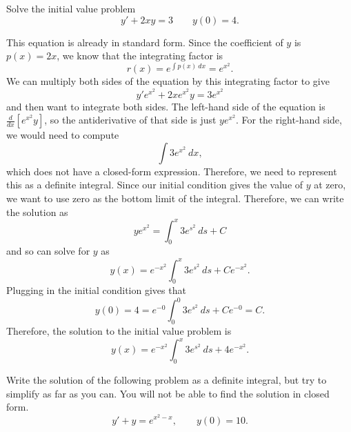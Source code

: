 \begin{example}
Solve the initial value problem
\begin{equation*}
y' + 2xy = 3 \qquad y(0) = 4.
\end{equation*}
\end{example}
\begin{exampleSol}
This equation is already in standard form. Since the coefficient of $y$ is $p(x) = 2x$, we know that the integrating factor is 
\begin{equation*}
r(x) = e^{\int p(x)\ dx} = e^{x^2}.
\end{equation*}
We can multiply both sides of the equation by this integrating factor to give
\begin{equation*}
y'e^{x^2} + 2xe^{x^2}y = 3e^{x^2}
\end{equation*} and then want to integrate both sides. The left-hand side of the equation is $\frac{d}{dx}[e^{x^2}y]$, so the antiderivative of that side is just $ye^{x^2}$. For the right-hand side, we would need to compute
\[ \int 3e^{x^2}\ dx, \] which does not have a closed-form expression. Therefore, we need to represent this as a definite integral. Since our initial condition gives the value of $y$ at zero, we want to use zero as the bottom limit of the integral. Therefore, we can write the solution as
\[ ye^{x^2} = \int_0^x 3e^{s^2}\ ds + C \] and so can solve for $y$ as
\begin{equation*}
y(x) = e^{-x^2} \int_0^x 3e^{s^2}\ ds + Ce^{-x^2}.
\end{equation*}
Plugging in the initial condition gives that
\begin{equation*}
y(0) = 4 = e^{-0} \int_0^0 3e^{s^2}\ ds + Ce^{-0} = C.
\end{equation*}
Therefore, the solution to the initial value problem is
\begin{equation*}
y(x) = e^{-x^2} \int_0^x 3e^{s^2}\ ds + 4e^{-x^2}.
\end{equation*}
\end{exampleSol}


\begin{exercise}
Write the solution of the following problem
as a definite integral, but try to simplify as far as you can.  You will not
be able to find the solution in closed form.
\begin{equation*}
y' + y = e^{x^2-x}, \qquad y(0) = 10 .
\end{equation*}
\end{exercise}


